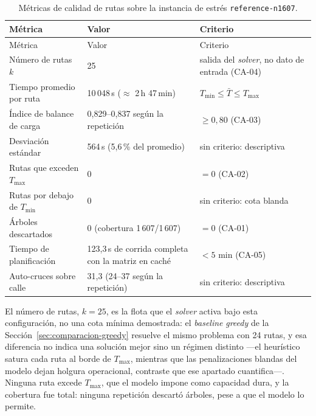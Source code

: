 \begin{xltabular}{\textwidth}{lXX}
  \caption{Métricas de calidad de rutas sobre la instancia de estrés \texttt{reference-n1607}.}
  \label{tab:metricas} \\
  \toprule
  Métrica & Valor & Criterio \\
  \midrule
  \endfirsthead
  \toprule
  Métrica & Valor & Criterio \\
  \midrule
  \endhead
  \bottomrule
  \endfoot
  \bottomrule
  \endlastfoot
    Número de rutas $k$ &
      25 &
      salida del \textit{solver}, no dato de entrada (CA-04) \\
      \addlinespace
    Tiempo promedio por ruta &
      10\,048\,s ($\approx$ 2\,h 47\,min) &
      $T_{\min} \leq \bar{T} \leq T_{\max}$ \\
      \addlinespace
    Índice de balance de carga &
      0{,}829--0{,}837 según la repetición &
      $\geq 0{,}80$ (CA-03) \\
      \addlinespace
    Desviación estándar &
      564\,s (5{,}6\,\% del promedio) &
      sin criterio: descriptiva \\
      \addlinespace
    Rutas que exceden $T_{\max}$ &
      0 &
      $= 0$ (CA-02) \\
      \addlinespace
    Rutas por debajo de $T_{\min}$ &
      0 &
      sin criterio: cota blanda \\
      \addlinespace
    Árboles descartados &
      0 (cobertura 1\,607/1\,607) &
      $= 0$ (CA-01) \\
      \addlinespace
    Tiempo de planificación &
      123{,}3\,s de corrida completa con la matriz en caché &
      $< 5$ min (CA-05) \\
      \addlinespace
    Auto-cruces sobre calle &
      31{,}3 (24--37 según la repetición) &
      sin criterio: descriptiva \\
\end{xltabular}

El número de rutas, $k=25$, es la flota que el \textit{solver} activa bajo esta configuración, no
una cota mínima demostrada: el \textit{baseline} \textit{greedy} de la
Sección~\ref{sec:comparacion-greedy} resuelve el mismo problema con 24 rutas, y esa diferencia no
indica una solución mejor sino un régimen distinto ---el heurístico satura cada ruta al borde de
$T_{\max}$, mientras que las penalizaciones blandas del modelo dejan holgura operacional, contraste
que ese apartado cuantifica---. Ninguna ruta excede
$T_{\max}$, que el modelo impone como capacidad dura, y la cobertura fue total: ninguna repetición
descartó árboles, pese a que el modelo lo permite.

